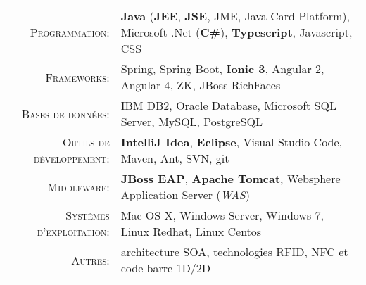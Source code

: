 %
%
%

\renewcommand{\arraystretch}{1.1}

	\begin{tabular}{>{}r>{}p{13cm}} 
		\textsc{Programmation:}  		&   \textbf{Java} (\textbf{JEE}, \textbf{JSE}, JME, Java Card Platform), Microsoft .Net (\textbf{C\#}), \textbf{Typescript}, Javascript, CSS\\ 
		\textsc{Frameworks:}                  		&   Spring, Spring Boot, \textbf{Ionic 3}, Angular 2, Angular 4, ZK, JBoss RichFaces\\ 
		\textsc{Bases de données:}                  &   IBM DB2, Oracle Database, Microsoft SQL Server, MySQL, PostgreSQL \\ 
		\textsc{Outils de développement:}	  		&   \textbf {IntelliJ Idea}, \textbf {Eclipse}, Visual Studio Code, Maven, Ant, SVN, git\\
		\textsc{Middleware:}				        &   \textbf{JBoss EAP}, \textbf{Apache Tomcat}, Websphere Application Server (\emph{WAS})\\ 
		\textsc{Systèmes d'exploitation:}	        &   Mac OS X, Windows Server, Windows 7, Linux Redhat, Linux Centos\\ 
		\textsc{Autres:}					        &   architecture SOA, technologies RFID, NFC et code barre 1D/2D
	\end{tabular}